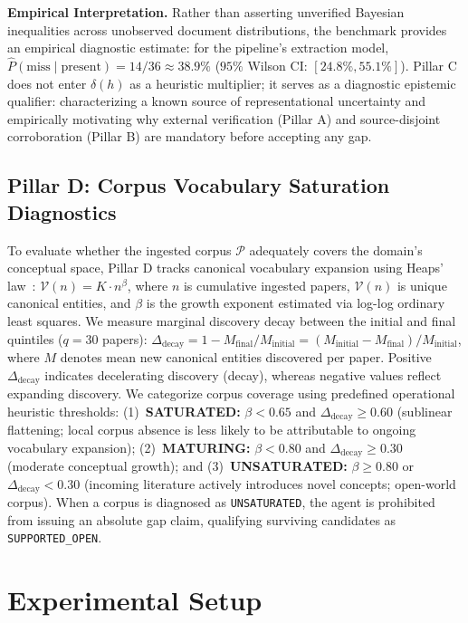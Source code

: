 \documentclass[runningheads]{llncs}
\begin{document}
\noindent\textbf{Empirical Interpretation.} Rather than asserting unverified Bayesian inequalities across unobserved document distributions, the benchmark provides an empirical diagnostic estimate: for the pipeline's extraction model, $\hat{P}(\text{miss} \mid \text{present}) = 14/36 \approx 38.9\%$ ($95\%$ Wilson CI: $[24.8\%, 55.1\%]$). Pillar C does not enter $\delta(h)$ as a heuristic multiplier; it serves as a diagnostic epistemic qualifier: characterizing a known source of representational uncertainty and empirically motivating why external verification (Pillar A) and source-disjoint corroboration (Pillar B) are mandatory before accepting any gap.

\subsection{Pillar D: Corpus Vocabulary Saturation Diagnostics}
To evaluate whether the ingested corpus $\mathcal{P}$ adequately covers the domain's conceptual space, Pillar D tracks canonical vocabulary expansion using Heaps' law~\cite{heaps1978}: $\mathcal{V}(n) = K \cdot n^\beta$, where $n$ is cumulative ingested papers, $\mathcal{V}(n)$ is unique canonical entities, and $\beta$ is the growth exponent estimated via log-log ordinary least squares. We measure marginal discovery decay between the initial and final quintiles ($q = 30$ papers): $\Delta_{\text{decay}} = 1 - M_{\text{final}} / M_{\text{initial}} = (M_{\text{initial}} - M_{\text{final}}) / M_{\text{initial}}$, where $M$ denotes mean new canonical entities discovered per paper. Positive $\Delta_{\text{decay}}$ indicates decelerating discovery (decay), whereas negative values reflect expanding discovery. We categorize corpus coverage using predefined operational heuristic thresholds: (1)~\textbf{SATURATED:} $\beta < 0.65$ and $\Delta_{\text{decay}} \ge 0.60$ (sublinear flattening; local corpus absence is less likely to be attributable to ongoing vocabulary expansion); (2)~\textbf{MATURING:} $\beta < 0.80$ and $\Delta_{\text{decay}} \ge 0.30$ (moderate conceptual growth); and (3)~\textbf{UNSATURATED:} $\beta \ge 0.80$ or $\Delta_{\text{decay}} < 0.30$ (incoming literature actively introduces novel concepts; open-world corpus). When a corpus is diagnosed as \texttt{UNSATURATED}, the agent is prohibited from issuing an absolute gap claim, qualifying surviving candidates as \texttt{SUPPORTED\_OPEN}.

\section{Experimental Setup}
\label{sec:setup}
\end{document}
